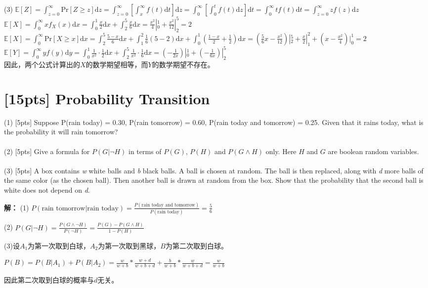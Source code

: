 \documentclass{article}
\begin{document}
\begin{spacing}{2.0}
	(3)
	$\mathbb{E}[Z]
	=\int_{z=0}^\infty \mathrm{Pr}[Z\geq z]\mathrm{d}z
	=\int_{z=0}^\infty [\int_{x}^\infty f(t)\mathrm{d}t]\mathrm{d}z
	=\int_{0}^{\infty}[\int_{0}^{t}f(t)\mathrm{d}z]\mathrm{d}t
	=\int_{0}^{\infty}tf(t)\mathrm{d}t
	=\int_{z=0}^{\infty}zf(z)\mathrm{d}z$\\
	$\mathbb{E}[X]=\int_{0}^{\infty}xf_X(x)\mathrm{d}x
	=\int_{0}^{1}\frac{x}{2}\mathrm{d}x+\int_{2}^{5}\frac{x}{6}\mathrm{d}x
	=\frac{x^2}{4}|_0^1+\frac{x^2}{12}|_2^5
	=2$\\
	$\mathbb{E}[X]=\int_{0}^\infty \mathrm{Pr}[X\geq x]\mathrm{d}x
	=\int_{2}^{5}\frac{5-x}{6}\mathrm{d}x
	+\int_{1}^{2}\frac{1}{6}(5-2)\mathrm{d}x
	+\int_{0}^{1}(\frac{1-x}{2}+\frac{1}{2})\mathrm{d}x
	=(\frac{5}{6}x-\frac{x^2}{12})|_2^5+\frac{x}{2}|_1^2+(x-\frac{x^2}{4})|_0^1
	=2$\\
	$\mathbb{E}[Y]
	=\int_{0}^{\infty}yf(y)\mathrm{d}y
	=\int_{0}^{1}\frac{1}{x^2}\cdot\frac{1}{2}\mathrm{d}x
	+\int_{2}^{5}\frac{1}{x^2}\cdot\frac{1}{6}\mathrm{d}x
	=(-\frac{1}{2x})|_0^1+(-\frac{1}{6x})|_2^5$\\
	因此，两个公式计算出的$X$的数学期望相等，而$Y$的数学期望不存在。
	\end{spacing}





	\section{[15pts] Probability Transition}
	
	(1) [5pts] Suppose P(rain today) = 0.30, P(rain tomorrow) = 0.60,
	P(rain today and tomorrow) = 0.25. Given that it rains today, what
	is the probability it will rain tomorrow?\\\\
	(2) [5pts] Give a formula for $P(G | \neg H)$ in terms of $P(G)$,
	$P(H)$ and $P(G \wedge H)$ only.  Here $H$ and $G$ are boolean random variables.\\ \\
	(3) [5pts] A box contains {\it w} white balls and {\it b} black
	balls. A ball is chosen at random. The ball is then replaced,
	along with {\it d} more balls of the same color (as the chosen
	ball). Then another ball is drawn at random from the box. Show
	that the probability that the second ball is white does not depend
	on {\it d}.  
	
	\begin{spacing}{2.0}
	\textbf{解：}
	(1)
	$P(\text{rain tomorrow|rain today})
	=\frac{P(\text{rain today and tomorrow})}{P(\text{rain today})}
	=\frac{5}{6}$

	(2)
	$P(G|\neg H)=\frac{P(G\wedge\neg H)}{P(\neg H)}
	=\frac{P(G)-P(G\wedge H)}{1-P(H)}$

	(3)设$A_1$为第一次取到白球，$A_2$为第一次取到黑球，$B$为第二次取到白球。

	$P(B)=P(B|A_1)+P(B|A_2)
	=\frac{w}{w+b}*\frac{w+d}{w+b+d}+\frac{b}{w+b}*\frac{w}{w+b+d}
	=\frac{w}{w+b}$

	因此第二次取到白球的概率与$d$无关。
	\end{spacing}
\end{document}
